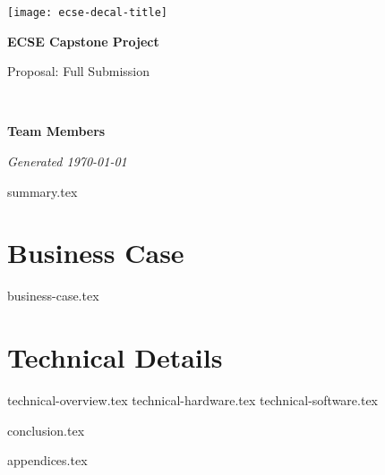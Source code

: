 \documentclass{capstone}
\begin{document}

\titlepage
	{\texttt{[image: ecse-decal-title]}}
	{
		\centering\sffamily
		{\Huge\bfseries ECSE Capstone Project\par}
		\vspace{16pt} 
		{\LARGE Proposal: Full Submission\par} 
		\vspace{24pt}
		{\huge\bfseries \teamname\par} %
	}


~\vfill

\noindent \textbf{Team Members}
\teammembers

\noindent \textit{Generated \today}

\tableofcontents

\cleardoublepage
{summary.tex}

\cleardoublepage

\part{Business Case}
{business-case.tex}

\part{Technical Details}
{technical-overview.tex}
{technical-hardware.tex}
{technical-software.tex}

\cleardoublepage

{conclusion.tex}

\begin{appendices}
{appendices.tex}
\end{appendices}
\end{document}
